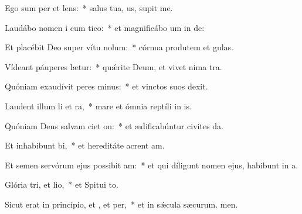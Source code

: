 \item Ego sum per et lens:~* salus tua, us, supit me.
\item Laudábo nomen i cum tico:~* et magnificábo um in de:
\item Et placébit Deo super vítu nolum:~* córnua produtem et gulas.
\item Vídeant páuperes  lætur:~* quǽrite Deum, et vivet nima tra.
\item Quóniam exaudívit peres minus:~* et vinctos suos  dexit.
\item Laudent illum li et ra,~* mare et ómnia reptíli in is.
\item Quóniam Deus salvam ciet on:~* et ædificabúntur civites da.
\item Et inhabibunt bi,~* et hereditáte acrent am.
\item Et semen servórum ejus possibit am:~* et qui díligunt nomen ejus, habibunt in a.
\item Glória tri, et lio,~* et Spitui to.
\item Sicut erat in princípio, et , et per,~* et in sǽcula sæcurum. men.
